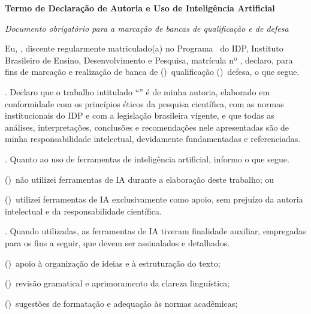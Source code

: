 \documentclass[\NivelTrabalho]{idp}
\begin{document}
\pagestyle{empty}
\idpcorpo{10.5bp}{13.8bp}
\color{termotexto}
\setlength{\parindent}{0pt}
\setlength{\parskip}{2pt}
\setlength{\emergencystretch}{1em}
\newcommand{\parterm}{\hangindent=6mm\hangafter=1\relax}
\newcommand{\opcaotermo}{\parterm(\hspace{1.2mm})\ }
\begin{center}
{\idpcorpo{14bp}{16bp}\color{black}\bfseries
Termo de Declaração de Autoria e Uso de Inteligência Artificial\par}
{\idpcorpo{9bp}{11bp}\color{termosubtitulo}\itshape
Documento obrigatório para a marcação de bancas de qualificação e de defesa\par}
\end{center}
\vspace{2.4mm}

Eu, \NomeAutor, discente regularmente matriculado(a) no Programa \NomeVinculo\
do IDP, Instituto Brasileiro de Ensino, Desenvolvimento e Pesquisa, matrícula
nº \MatriculaPreenchivel,
declaro, para fins de marcação e realização de banca de
\mbox{\opcaotermo qualificação} \mbox{\opcaotermo defesa}, o que segue.

\parterm 1. Declaro que o trabalho intitulado ``\TituloCompletoTrabalho''
é de minha autoria, elaborado em conformidade com os princípios éticos da pesquisa
científica, com as normas institucionais do IDP e com a legislação brasileira
vigente, e que todas as análises, interpretações, conclusões e recomendações nele
apresentadas são de minha responsabilidade intelectual, devidamente fundamentadas
e referenciadas.

\parterm 2. Quanto ao uso de ferramentas de inteligência artificial, informo o que segue.

\opcaotermo não utilizei ferramentas de IA durante a elaboração deste trabalho; ou

\opcaotermo utilizei ferramentas de IA exclusivamente como apoio, sem prejuízo da
autoria intelectual e da responsabilidade científica.

\parterm 3. Quando utilizadas, as ferramentas de IA tiveram finalidade auxiliar, empregadas
para os fins a seguir, que devem ser assinalados e detalhados.

\opcaotermo apoio à organização de ideias e à estruturação do texto;

\opcaotermo revisão gramatical e aprimoramento da clareza linguística;

\opcaotermo sugestões de formatação e adequação às normas acadêmicas;
\end{document}
